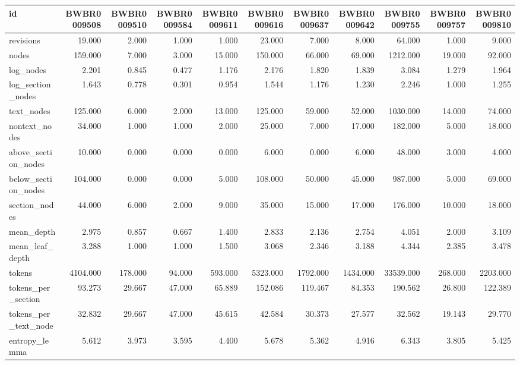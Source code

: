 \begin{tabular}{lrrrrrrrrrr}
\toprule
id & BWBR0009508 & BWBR0009510 & BWBR0009584 & BWBR0009611 & BWBR0009616 & BWBR0009637 & BWBR0009642 & BWBR0009755 & BWBR0009757 & BWBR0009810 \\
\midrule
revisions & 19.000 & 2.000 & 1.000 & 1.000 & 23.000 & 7.000 & 8.000 & 64.000 & 1.000 & 9.000 \\
\cline{1-11}
nodes & 159.000 & 7.000 & 3.000 & 15.000 & 150.000 & 66.000 & 69.000 & 1212.000 & 19.000 & 92.000 \\
\cline{1-11}
log\_nodes & 2.201 & 0.845 & 0.477 & 1.176 & 2.176 & 1.820 & 1.839 & 3.084 & 1.279 & 1.964 \\
\cline{1-11}
log\_section\_nodes & 1.643 & 0.778 & 0.301 & 0.954 & 1.544 & 1.176 & 1.230 & 2.246 & 1.000 & 1.255 \\
\cline{1-11}
text\_nodes & 125.000 & 6.000 & 2.000 & 13.000 & 125.000 & 59.000 & 52.000 & 1030.000 & 14.000 & 74.000 \\
\cline{1-11}
nontext\_nodes & 34.000 & 1.000 & 1.000 & 2.000 & 25.000 & 7.000 & 17.000 & 182.000 & 5.000 & 18.000 \\
\cline{1-11}
above\_section\_nodes & 10.000 & 0.000 & 0.000 & 0.000 & 6.000 & 0.000 & 6.000 & 48.000 & 3.000 & 4.000 \\
\cline{1-11}
below\_section\_nodes & 104.000 & 0.000 & 0.000 & 5.000 & 108.000 & 50.000 & 45.000 & 987.000 & 5.000 & 69.000 \\
\cline{1-11}
section\_nodes & 44.000 & 6.000 & 2.000 & 9.000 & 35.000 & 15.000 & 17.000 & 176.000 & 10.000 & 18.000 \\
\cline{1-11}
mean\_depth & 2.975 & 0.857 & 0.667 & 1.400 & 2.833 & 2.136 & 2.754 & 4.051 & 2.000 & 3.109 \\
\cline{1-11}
mean\_leaf\_depth & 3.288 & 1.000 & 1.000 & 1.500 & 3.068 & 2.346 & 3.188 & 4.344 & 2.385 & 3.478 \\
\cline{1-11}
tokens & 4104.000 & 178.000 & 94.000 & 593.000 & 5323.000 & 1792.000 & 1434.000 & 33539.000 & 268.000 & 2203.000 \\
\cline{1-11}
tokens\_per\_section & 93.273 & 29.667 & 47.000 & 65.889 & 152.086 & 119.467 & 84.353 & 190.562 & 26.800 & 122.389 \\
\cline{1-11}
tokens\_per\_text\_node & 32.832 & 29.667 & 47.000 & 45.615 & 42.584 & 30.373 & 27.577 & 32.562 & 19.143 & 29.770 \\
\cline{1-11}
entropy\_lemma & 5.612 & 3.973 & 3.595 & 4.400 & 5.678 & 5.362 & 4.916 & 6.343 & 3.805 & 5.425 \\

\end{tabular}
